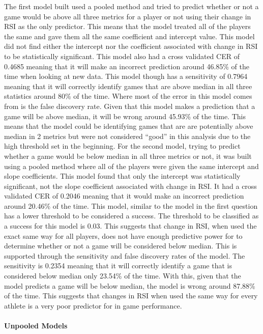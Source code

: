 \documentclass[
]{article}
\begin{document}
The first model built used a pooled method and tried to predict whether
or not a game would be above all three metrics for a player or not using
their change in RSI as the only predictor. This means that the model
treated all of the players the same and gave them all the same
coefficient and intercept value. This model did not find either the
intercept nor the coefficient associated with change in RSI to be
statistically significant. This model also had a cross validated CER of
0.4685 meaning that it will make an incorrect prediction around 46.85\%
of the time when looking at new data. This model though has a
sensitivity of 0.7964 meaning that it will correctly identify games that
are above median in all three statistics around 80\% of the time. Where
most of the error in this model comes from is the false discovery rate.
Given that this model makes a prediction that a game will be above
median, it will be wrong around 45.93\% of the time. This means that the
model could be identifying games that are are potentially above median
in 2 metrics but were not considered ``good'' in this analysis due to
the high threshold set in the beginning. For the second model, trying to
predict whether a game would be below median in all three metrics or
not, it was built using a pooled method where all of the players were
given the same intercept and slope coefficients. This model found that
only the intercept was statistically significant, not the slope
coefficient associated with change in RSI. It had a cross validated CER
of 0.2046 meaning that it would make an incorrect prediction around
20.46\% of the time. This model, similar to the model in the first
question has a lower threshold to be considered a success. The threshold
to be classified as a success for this model is 0.03. This suggests that
change in RSI, when used the exact same way for all players, does not
have enough predictive power for to determine whether or not a game will
be considered below median. This is supported through the sensitivity
and false discovery rates of the model. The sensitivity is 0.2354
meaning that it will correctly identify a game that is considered below
median only 23.54\% of the time. With this, given that the model
predicts a game will be below median, the model is wrong around 87.88\%
of the time. This suggests that changes in RSI when used the same way
for every athlete is a very poor predictor for in game performance.

\paragraph{Unpooled Models}\label{unpooled-models}
\end{document}
